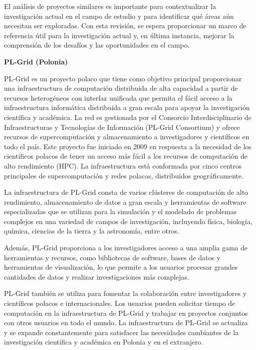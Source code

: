 \begin{spacing}{1.5}
  El análisis de proyectos similares es importante para contextualizar la
  investigación actual en el campo de estudio y para identificar qué áreas aún
  necesitan ser exploradas. Con esta revisión, se espera proporcionar un marco de
  referencia útil para la investigación actual y, en última instancia, mejorar la
  comprensión de los desafíos y las oportunidades en el campo.

  \textbf{PL-Grid (Polonia)}

  PL-Grid es un proyecto polaco que tiene como objetivo principal proporcionar
  una infraestructura de computación distribuida de alta capacidad a partir de
  recursos heterogéneos con interfaz unificada que permita el fácil acceso a la
  infraestructura informática distribuida a gran escala para apoyar la
  investigación científica y académica. La red es gestionada por el Consorcio
  Interdisciplinario de Infraestructuras y Tecnologías de Información (PL-Grid
  Consortium) y ofrece recursos de supercomputación y almacenamiento a
  investigadores y científicos en todo el país. Este proyecto fue iniciado en
  2009 en respuesta a la necesidad de los científicos polacos de tener un acceso
  más fácil a los recursos de computación de alto rendimiento (HPC). La
  infraestructura está conformada por cinco centros principales de
  supercomputación y redes polacas, distribuidos geográficamente.

  La infraestructura de PL-Grid consta de varios clústeres de computación de
  alto rendimiento, almacenamiento de datos a gran escala y herramientas de
  software especializadas que se utilizan para la simulación y el modelado de
  problemas complejos en una variedad de campos de investigación, incluyendo
  física, biología, química, ciencias de la tierra y la astronomía, entre otros.

  Además, PL-Grid proporciona a los investigadores acceso a una amplia gama de
  herramientas y recursos, como bibliotecas de software, bases de datos y
  herramientas de visualización, lo que permite a los usuarios procesar grandes
  cantidades de datos y realizar investigaciones más complejas.

  PL-Grid también se utiliza para fomentar la colaboración entre investigadores
  y científicos polacos e internacionales. Los usuarios pueden solicitar tiempo
  de computación en la infraestructura de PL-Grid y trabajar en proyectos
  conjuntos con otros usuarios en todo el mundo. La infraestructura de PL-Grid se
  actualiza y se expande constantemente para satisfacer las necesidades
  cambiantes de la investigación científica y académica en Polonia y en el
  extranjero.


\end{spacing}
